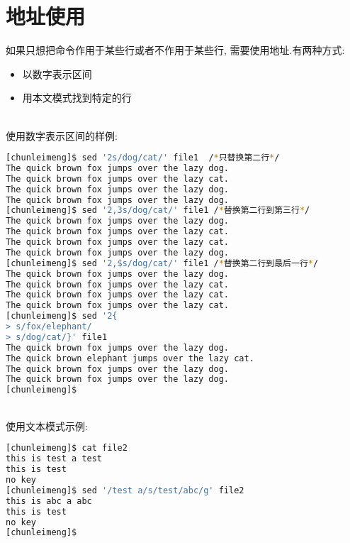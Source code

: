 \documentclass{article}
\begin{document}
\section{地址使用}
如果只想把命令作用于某些行或者不作用于某些行, 需要使用地址.有两种方式: \par
\begin{itemize}
	\item 以数字表示区间
	\item 用本文模式找到特定的行
\end{itemize}
~\\
使用数字表示区间的样例: \par
\begin{lstlisting}[language=bash, caption={Address}]
[chunleimeng]$ sed '2s/dog/cat/' file1  /*只替换第二行*/
The quick brown fox jumps over the lazy dog.
The quick brown fox jumps over the lazy cat.
The quick brown fox jumps over the lazy dog.
The quick brown fox jumps over the lazy dog.
[chunleimeng]$ sed '2,3s/dog/cat/' file1 /*替换第二行到第三行*/
The quick brown fox jumps over the lazy dog.
The quick brown fox jumps over the lazy cat.
The quick brown fox jumps over the lazy cat.
The quick brown fox jumps over the lazy dog.
[chunleimeng]$ sed '2,$s/dog/cat/' file1 /*替换第二行到最后一行*/
The quick brown fox jumps over the lazy dog.
The quick brown fox jumps over the lazy cat.
The quick brown fox jumps over the lazy cat.
The quick brown fox jumps over the lazy cat.
[chunleimeng]$ sed '2{
> s/fox/elephant/
> s/dog/cat/}' file1
The quick brown fox jumps over the lazy dog.
The quick brown elephant jumps over the lazy cat.
The quick brown fox jumps over the lazy dog.
The quick brown fox jumps over the lazy dog.
[chunleimeng]$
\end{lstlisting}
\par
~\\
使用文本模式示例: \par
\begin{lstlisting}[language=bash, caption={Address}]
[chunleimeng]$ cat file2
this is test a test
this is test
no key
[chunleimeng]$ sed '/test a/s/test/abc/g' file2
this is abc a abc
this is test
no key
[chunleimeng]$
\end{lstlisting}
\end{document}
